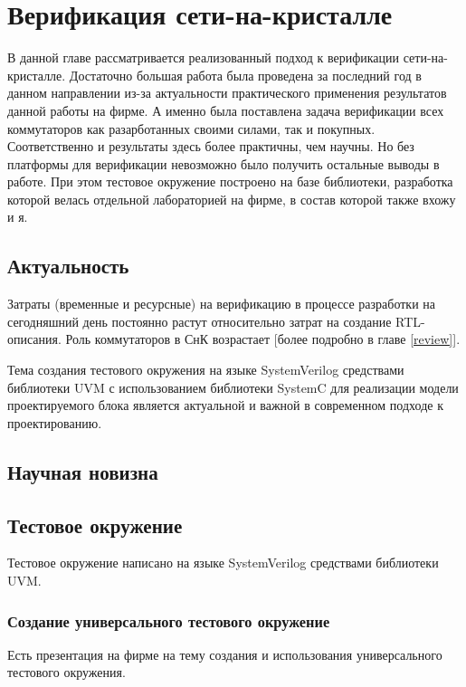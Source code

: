 
\chapter{Верификация сети-на-кристалле}

В данной главе рассматривается реализованный подход к верификации сети-на-кристалле. Достаточно большая работа была проведена за последний год в данном направлении из-за актуальности практического применения результатов данной работы на фирме. А именно была поставлена задача верификации всех коммутаторов как разарботанных своими силами, так и покупных. Соответственно и результаты здесь более практичны, чем научны. Но без платформы для верификации невозможно было получить остальные выводы в работе. При этом тестовое окружение построено на базе библиотеки, разработка которой велась отдельной лабораторией на фирме, в состав которой также вхожу и я.

\section{Актуальность}

Затраты (временные и ресурсные) на верификацию в процессе разработки на сегодняшний день постоянно растут относительно затрат на создание RTL-описания. Роль коммутаторов в СнК возрастает [более подробно в главе \ref{review}].

Тема создания тестового окружения на языке SystemVerilog средствами библиотеки UVM с использованием библиотеки SystemC для реализации модели проектируемого блока является актуальной и важной в современном подходе к проектированию.

\section{Научная новизна}

\section{Тестовое окружение}

Тестовое окружение написано на языке SystemVerilog средствами библиотеки UVM.

\subsection{Создание универсального тестового окружение}

Есть презентация на фирме на тему создания и использования универсального тестового окружения.

